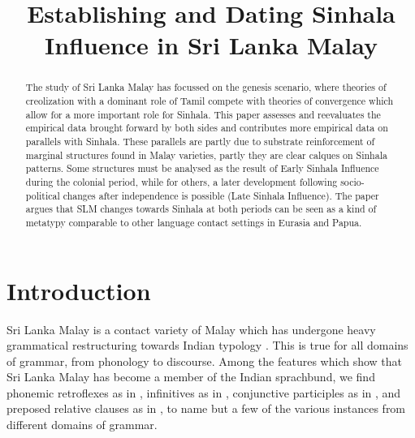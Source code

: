 \documentclass[a4paper,10pt]{article}
\title{Establishing and Dating Sinhala Influence in Sri Lanka Malay}
\begin{document}
\let\eachwordone=\it
\let\eachwordtwo=\rm
\let\eachwordthree=\rm

\maketitle
 
\begin{abstract}
  The study of Sri Lanka Malay has focussed on the genesis scenario, where theories of creolization \citep{SmithEtAl2004,SmithEtAl2006cll} with a dominant role of Tamil compete with theories of convergence \citep{Bakker2006,Ansaldo2008genesis} which allow for a more important role for Sinhala. This paper assesses and reevaluates the empirical data brought forward by both sides and contributes more empirical data on parallels with Sinhala. These parallels are  partly due to substrate reinforcement \citep{Siegel1998substrate} of marginal structures found in Malay varieties, partly they are clear calques on Sinhala patterns. Some structures must be analysed as the result of Early Sinhala Influence during the colonial period, while for others, a later development following socio-political changes after independence is possible (Late Sinhala Influence). The paper argues that SLM changes towards Sinhala at both periods can be seen as a kind of metatypy comparable to other language contact settings in Eurasia and Papua.
\end{abstract}


\section{Introduction} 
Sri Lanka Malay is a contact variety of  Malay which has undergone heavy grammatical restructuring towards Indian typology \citep{Adelaar1991, Paauw2004, SmithEtAl2004, SmithEtAl2006cll, Slomanson2006cll, Bakker2006, Ansaldo2008genesis, Nordhoff2009phd}. This is true for all domains of grammar, from phonology to discourse. Among the features which show that Sri Lanka Malay has become a member of the Indian sprachbund, we find phonemic retroflexes as in ,  infinitives as in , conjunctive participles as in ,
and
preposed relative clauses as in ,
to name but a few of the various instances from different domains of grammar.

\end{document}
